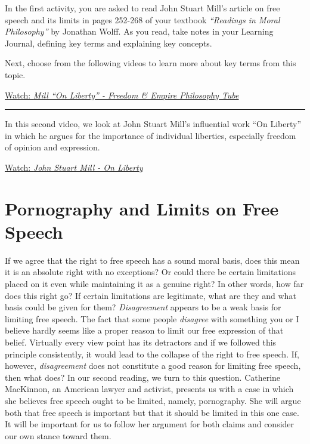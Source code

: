 \documentclass[
]{book}
\begin{document}
\begin{reflect}
In the first activity, you are asked to read John Stuart Mill's article on free speech and its limits in pages 252-268 of your textbook \emph{``Readings in Moral Philosophy''} by Jonathan Wolff. As you read, take notes in your Learning Journal, defining key terms and explaining key concepts.

Next, choose from the following videos to learn more about key terms from this topic.

\href{https://www.youtube.com/watch?v=_wF2aIQM4M8}{Watch: \emph{Mill ``On Liberty'' - Freedom \& Empire \textbar{} Philosophy Tube}}

\begin{center}\rule{0.5\linewidth}{0.5pt}\end{center}

In this second video, we look at John Stuart Mill's influential work ``On Liberty'' in which he argues for the importance of individual liberties, especially freedom of opinion and expression.

\href{https://www.youtube.com/watch?v=QWZrHUvhXcw}{Watch: \emph{John Stuart Mill - On Liberty}}
\end{reflect}

\hypertarget{pornography-and-limits-on-free-speech}{%
\section{Pornography and Limits on Free Speech}\label{pornography-and-limits-on-free-speech}}

If we agree that the right to free speech has a sound moral basis, does this mean it is an absolute right with no exceptions? Or could there be certain limitations placed on it even while maintaining it as a genuine right? In other words, how far does this right go? If certain limitations are legitimate, what are they and what basis could be given for them? \emph{Disagreement} appears to be a weak basis for limiting free speech. The fact that some people \emph{disagree} with something you or I believe hardly seems like a proper reason to limit our free expression of that belief. Virtually every view point has its detractors and if we followed this principle consistently, it would lead to the collapse of the right to free speech. If, however, \emph{disagreement} does not constitute a good reason for limiting free speech, then what does? In our second reading, we turn to this question. Catherine MacKinnon, an American lawyer and activist, presents us with a case in which she believes free speech ought to be limited, namely, pornography. She will argue both that free speech is important but that it should be limited in this one case. It will be important for us to follow her argument for both claims and consider our own stance toward them.
\end{document}
